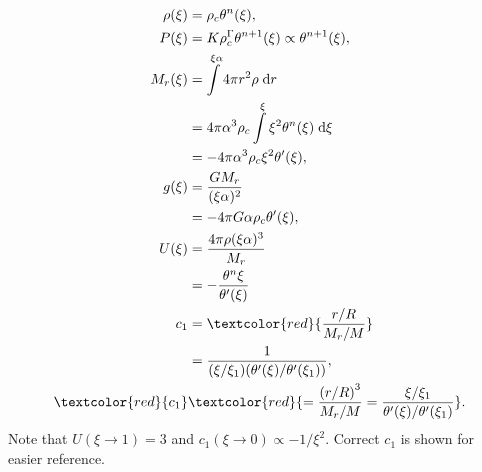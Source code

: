 \documentclass[11pt,
        usenames, %
        twocolumn,
        landscape,
        dvipsnames %
    ]{article}
\newcommand*{\p}[1]{\left(#1\right)}
\begin{document}
\begin{align}
    \rho(\xi) &= \rho_c \theta^n(\xi),\\
    P(\xi) &= K\rho_c^\Gamma \theta^{n + 1}(\xi) \propto \theta^{n + 1}(\xi),\\
    M_r(\xi) &= \int\limits^{\xi \alpha} 4\pi r^2\rho\;\mathrm{d}r\nonumber\\
        &= 4\pi \alpha^3 \rho_c
            \int\limits^{\xi} \xi^2\theta^n(\xi)\;\mathrm{d}\xi\nonumber\\
        &= -4\pi \alpha^3 \rho_c \xi^2\theta'(\xi),\\
    g(\xi) &= \frac{GM_r}{(\xi\alpha)^2}\nonumber\\
        &= -4\pi G \alpha \rho_c \theta'(\xi),\\
    U(\xi) &= \frac{4\pi \rho (\xi\alpha)^3}{M_r}\nonumber\\
        &= -\frac{\theta^n \xi}{\theta'(\xi)}\\
    c_1 &= \textcolor{red}{\frac{r / R}{M_r / M}}\nonumber\\
        &= \frac{1}{(\xi / \xi_1)(\theta'(\xi) / \theta'(\xi_1))},\\
    \textcolor{red}{c_1}&\textcolor{red}{= \frac{\p{r / R}^3}{M_r / M}
        = \frac{\xi / \xi_1}{\theta'(\xi) / \theta'(\xi_1)}}.
\end{align}
Note that $U(\xi \to 1) = 3$ and $c_1(\xi \to 0) \propto -1 / \xi^2$. Correct
$c_1$ is shown for easier reference.
\end{document}
